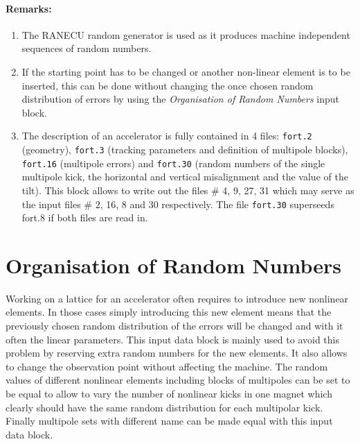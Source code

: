 \paragraph{Remarks:}

\begin{enumerate}
    \item The RANECU random generator \cite{RANECU} is used as it produces machine independent sequences of random numbers.
    \item If the starting point has to be changed or another non-linear element is to be inserted, this can be done without changing the once chosen random distribution of errors by using the \textit{Organisation of Random Numbers} input block.
    \item The description of an accelerator is fully contained in 4 files: \texttt{fort.2} (geometry), \texttt{fort.3} (tracking parameters and definition of multipole blocks), \texttt{fort.16} (multipole errors) and \texttt{fort.30} (random numbers of the single multipole kick, the horizontal and vertical misalignment and the value of the tilt). This block allows to write  out the files \# 4, 9, 27, 31 which may serve as the input files \# 2, 16, 8 and 30 respectively. The file \texttt{fort.30} superseeds fort.8 if both files are read in.
\end{enumerate}

\section{Organisation of Random Numbers} \label{OrgRan}

Working on a lattice for an accelerator often requires to introduce new nonlinear elements.
In those cases simply introducing this new element means that the previously chosen random distribution of the errors will be changed and with it often the linear parameters.
This input data block is mainly used to avoid this problem by reserving extra random numbers for the new elements.
It also allows to change the observation point without affecting the machine.
The random values of different nonlinear elements including blocks of multipoles can be set to be equal to allow to vary the number of nonlinear kicks in one magnet which clearly should have the same random distribution for each multipolar kick.
Finally multipole sets with different name can be made equal with this input data block.


